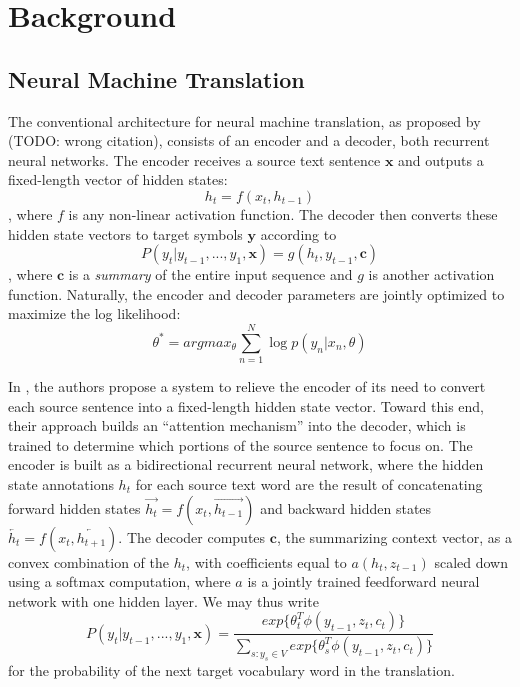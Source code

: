 \section{Background}
\label{sec:background}

\subsection{Neural Machine Translation}
The conventional architecture for neural machine translation, as proposed by  (TODO: wrong citation),
consists of an encoder and a decoder, both recurrent neural networks. The encoder receives
a source text sentence $\mathbf{x}$ and outputs a fixed-length vector of hidden states:
\begin{equation}
h_{t} = f(x_{t}, h_{t-1})
\end{equation},
where $f$ is any non-linear activation function. The decoder then converts these hidden state vectors to
target symbols $\mathbf{y}$ according to
\begin{equation}
P(y_{t} | y_{t-1}, ..., y_{1}, \mathbf{x}) = g(h_{t}, y_{t-1}, \mathbf{c})
\end{equation},
where $\mathbf{c}$ is a \emph{summary} of the entire input sequence and $g$ is another activation function.
Naturally, the encoder and decoder parameters are jointly optimized to maximize the log likelihood:
\begin{equation}
\theta^{*} = argmax_{\theta} \sum_{n=1}^{N}\log p(y_{n} | x_{n}, \theta)
\end{equation}

In , the authors propose a system to relieve the encoder of its need
to convert each source sentence into a fixed-length hidden state vector. Toward this end, their approach builds an ``attention mechanism''
into the decoder, which is trained to determine which portions of the source sentence to focus on. The encoder
is built as a bidirectional recurrent neural network, where the hidden state annotations $h_{t}$ for each source text word
are the result of concatenating forward hidden states $\overrightarrow{h_{t}} = f(x_{t}, \overrightarrow{h_{t-1}})$ and backward hidden states
$\overleftarrow{h_{t}} = f(x_{t}, \overleftarrow{h_{t+1}})$. The decoder computes $\mathbf{c}$, the summarizing context vector,
as a convex combination of the $h_{t}$, with coefficients equal to $a(h_{t}, z_{t-1})$ scaled down using a softmax computation, where $a$ is a
jointly trained feedforward neural network with one hidden layer. We may thus write
\begin{equation}
P(y_{t} | y_{t-1}, ..., y_{1}, \mathbf{x}) = \dfrac{exp\{\theta_{t}^{T} \phi(y_{t-1}, z_{t}, c_{t})\}}{\displaystyle\sum_{s:y_{s} \in V} exp\{\theta_{s}^{T} \phi(y_{t-1}, z_{t}, c_{t})\}}
\end{equation}
for the probability of the next target vocabulary word in the translation.\\

